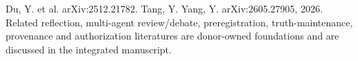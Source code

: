 \markdownRendererDocumentBegin
\markdownRendererSectionBegin
{}\markdownRendererInterblockSeparator
{}\markdownRendererUlBeginTight
\markdownRendererUlItem Du, Y. et al.  arXiv:2512.21782.\markdownRendererUlItemEnd 
\markdownRendererUlItem Tang, Y. \markdownRendererAmpersand{} Yang, Y.  arXiv:2605.27905, 2026.\markdownRendererUlItemEnd 
\markdownRendererUlItem Related reflection, multi-agent review/debate, preregistration, truth-maintenance, provenance and authorization literatures are donor-owned foundations and are discussed in the integrated manuscript.\markdownRendererUlItemEnd 
\markdownRendererUlEndTight 
\markdownRendererSectionEnd \markdownRendererDocumentEnd